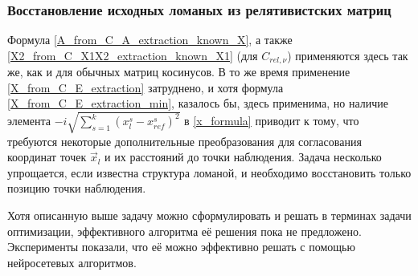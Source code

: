 \subsubsection{Восстановление исходных ломаных из релятивистских матриц}
Формула \ref{A_from_C_A_extraction_known_X}, а также \ref{X2_from_C_X1X2_extraction_known_X1} (для $C_{rel,\nu}$) применяются здесь так же, как и для обычных матриц косинусов.
В то же время применение \ref{X_from_C_E_extraction} затруднено, и хотя формула \ref{X_from_C_E_extraction_min}, казалось бы, здесь применима,
но наличие элемента $-i\sqrt{\sum_{s=1}^{k}(x^s_l - x^s_{ref})^2}$ в \ref{x_formula} приводит к тому,
что требуются некоторые дополнительные преобразования для согласования координат точек $\vec{x}_l$ и их расстояний до точки наблюдения.
Задача несколько упрощается, если известна структура ломаной, и необходимо восстановить только позицию точки наблюдения.

Хотя описанную выше задачу можно сформулировать и решать в терминах задачи оптимизации, эффективного алгоритма её решения пока не предложено.
Эксперименты показали, что её можно эффективно решать с помощью нейросетевых алгоритмов.
